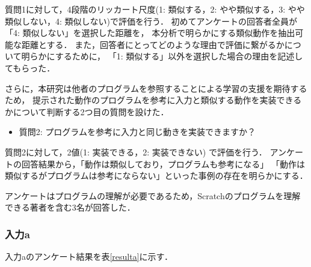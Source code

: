 \documentclass[11pt]{jreport}
\begin{document}
質問1に対して，4段階のリッカート尺度(1: 類似する，2: やや類似する，3: やや類似しない，4: 類似しない)で評価を行う．
初めてアンケートの回答者全員が「4: 類似しない」を選択した距離を，
本分析で明らかにする類似動作を抽出可能な距離とする．
また，回答者にとってどのような理由で評価に繋がるかについて明らかにするために，
「1: 類似する」以外を選択した場合の理由を記述してもらった．

さらに，本研究は他者のプログラムを参照することによる学習の支援を期待するため，
提示された動作のプログラムを参考に入力と類似する動作を実装できるかについて判断する2つ目の質問を設けた．

\begin{itemize}
    \item 質問2: プログラムを参考に入力と同じ動きを実装できますか？
\end{itemize}

質問2に対して，2値(1: 実装できる，2: 実装できない) で評価を行う．
アンケートの回答結果から，「動作は類似しており，プログラムも参考になる」
「動作は類似するがプログラムは参考にならない」といった事例の存在を明らかにする．

アンケートはプログラムの理解が必要であるため，Scratchのプログラムを理解できる著者を含む3名が回答した．

\subsubsection{入力a}
入力aのアンケート結果を表\ref{resulta}に示す．
\end{document}
